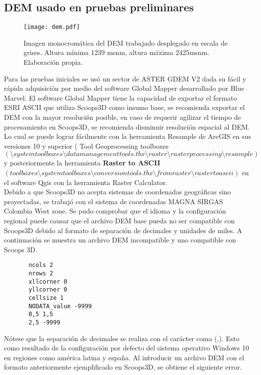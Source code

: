 \subsection{DEM usado en pruebas preliminares}

\begin{figure}[H]
\centering
\texttt{[image: dem.pdf]}
\caption{Imagen monocrom\'atica del DEM trabajado desplegado en escala de grises. Altura m\'inima 1239 msnm, altura m\'axima 2425msnm. Elaboraci\'on propia.}
\label{fig:dem usado}
\end{figure}


Para las pruebas iniciales se us\'o un sector de ASTER
GDEM V2 dada su f\'acil y r\'{a}pida adquisici\'on por medio del software Global Mapper
desarrollado por Blue Marvel.
El software Global Mapper tiene la capacidad de exportar el formato ESRI ASCII que utiliza
Scoops3D como insumo base, se recomienda exportar el DEM con la mayor resoluci\'{\o}n
posible, en caso de requerir agilizar el tiempo de procesamiento en Scoops3D, se
recomienda disminuir resoluci\'on espacial al DEM. Lo cual se puede lograr f\'{a}cilmente con la
herramienta Resample de ArcGIS en sus versiones 10 y superior (
Tool Geoprocessing
toolboxes $ (\setminus system toolboxes \setminus data management tools.tbx \setminus raster \setminus raster processing \setminus resample)$ y posteriormente la
herramienta \textbf{Raster to ASCII} $(toolboxes \setminus system toolboxes \setminus conversion tools.tbx \setminus from raster \setminus raster to ascii)$ en el software Qgis con la
herramienta Raster Calculator.\\
Debido a que Scoops3D no acepta sistemas de coordenadas geogr\'{a}ficas sino proyectadas,
se trabaj\'o con el sistema de coordenadas MAGNA SIRGAS Colombia West zone. 
Se pudo comprobar que el idioma y la configuraci\'on regional puede causar que el archivo
DEM base pueda no ser compatible con Scoops3D debido al formato de separaci\'on de
decimales y unidades de miles. A continuaci\'on se muestra un archivo DEM incompatible y
uno compatible con Scoops 3D.

\begin{verbatim}
	   ncols 2
	   nrows 2
	   xllcorner 0
	   yllcorner 0
	   cellsize 1
	   NODATA_value -9999
	   0,5 1,5
	   2,5 -9999
\end{verbatim}

N\'{o}tese que la separaci\'on de decimales se realiza con el car\'{a}cter coma (,). Esto como
resultado de la configuraci\'on por defecto del sistema operativo Windows 10 en regiones
como am\'{e}rica latina y espa\~na.
Al introducir un archivo DEM con el formato anteriormente ejemplificado en Scoops3D, se
obtiene el siguiente error.


